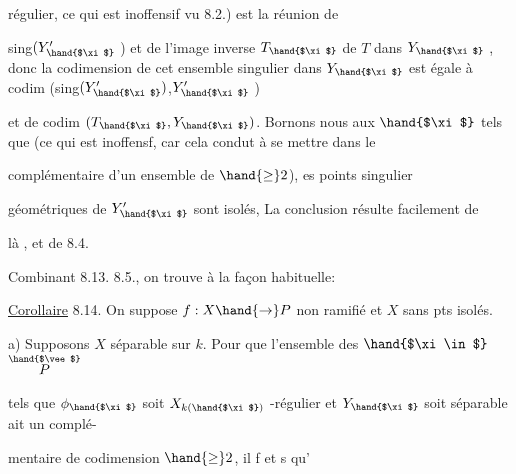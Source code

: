 régulier, ce qui est inoffensif vu 8.2.) est la réunion de

sing$(Y'_{\hand{$\xi$}}$ ) et de l'image inverse $T_{\hand{$\xi$}}$ de $T$ dans $Y_{\hand{$\xi$}}$ , donc la codimension
de cet ensemble singulier dans $Y_{\hand{$\xi$}}$ est égale à  codim (sing$(Y'_{\hand{$\xi$}})$,$Y'_{\hand{$\xi$}}$ )

et de codim $(T_{\hand{$\xi$}},Y_{\hand{$\xi$}})$. Bornons nous aux $\hand{$\xi$}$ tels que \hand{)}
\margin{$*$} 
(ce qui est inoffensf, car  cela condut à se mettre dans le

complémentaire d'un ensemble de  $\hand{\geq} 2$), es points singulier

géométriques de $Y'_{\hand{$\xi$}}$ sont  isolés, La conclusion résulte facilement de

là , et de 8.4. 

Combinant 8.13.  8.5., on trouve à la façon habituelle:

\uline{Corollaire} 8.14. On suppose $f:X\hand{\rightarrow} P$ non ramifié et $X$ sans pts isolés.

 a) Supposons $X$ séparable sur $k$. Pour que l'ensemble  des $\hand{$\xi \in$}$ $\overset{\hand{$\vee$}}{P}$

tels que $\phi_{\hand{$\xi$}}$ soit $X_{k(\hand{$\xi$})}$ -régulier et $Y_{\hand{$\xi$}}$ soit séparable ait un complé-%

mentaire de codimension $\hand{\geq} 2$, il f et s qu'

